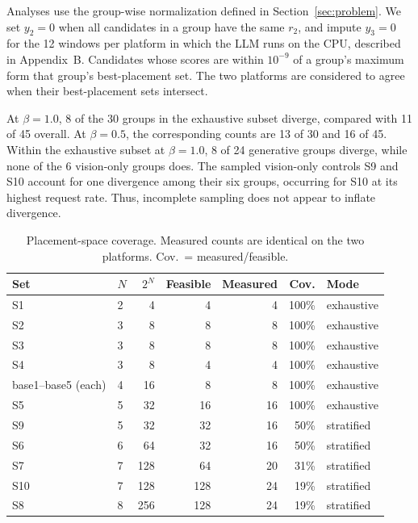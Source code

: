 \documentclass{article}
\begin{document}
Analyses use the group-wise normalization defined in Section~\ref{sec:problem}. We set $y_2{=}0$ when all candidates in a group have the same $r_2$, and impute $y_3{=}0$ for the 12 windows per platform in which the LLM runs on the CPU, described in Appendix~B. Candidates whose scores are within $10^{-9}$ of a group's maximum form that group's best-placement set. The two platforms are considered to agree when their best-placement sets intersect.

At $\beta{=}1.0$, 8 of the 30 groups in the exhaustive subset diverge, compared with 11 of 45 overall. At $\beta{=}0.5$, the corresponding counts are 13 of 30 and 16 of 45. Within the exhaustive subset at $\beta{=}1.0$, 8 of 24 generative groups diverge, while none of the 6 vision-only groups does. The sampled vision-only controls S9 and S10 account for one divergence among their six groups, occurring for S10 at its highest request rate. Thus, incomplete sampling does not appear to inflate divergence.

\begin{table}[h]
\centering
\caption{Placement-space coverage. Measured counts are identical on the
two platforms. Cov.\ = measured/feasible.}
\label{tab:app_coverage}
\footnotesize
\setlength{\tabcolsep}{5pt}
\begin{tabular}{@{}ll rrrr l@{}}
\toprule
Set & $N$ & $2^{N}$ & Feasible & Measured & Cov. & Mode \\
\midrule
S1  & 2 & 4   & 4   & 4  & 100\% & exhaustive \\
S2  & 3 & 8   & 8   & 8  & 100\% & exhaustive \\
S3  & 3 & 8   & 8   & 8  & 100\% & exhaustive \\
S4  & 3 & 8   & 4   & 4  & 100\% & exhaustive \\
base1--base5 (each) & 4 & 16 & 8 & 8 & 100\% & exhaustive \\
S5  & 5 & 32  & 16  & 16 & 100\% & exhaustive \\
S9  & 5 & 32  & 32  & 16 & 50\%  & stratified \\
S6  & 6 & 64  & 32  & 16 & 50\%  & stratified \\
S7  & 7 & 128 & 64  & 20 & 31\%  & stratified \\
S10 & 7 & 128 & 128 & 24 & 19\%  & stratified \\
S8  & 8 & 256 & 128 & 24 & 19\%  & stratified \\
\bottomrule
\end{tabular}
\end{table}
\end{document}
